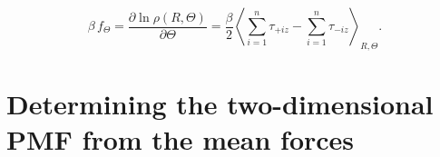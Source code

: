 \documentclass{article}
\begin{document}
%
%
$$
\beta \, f_{\Theta}
=
\frac{ \partial \ln \rho(R, \Theta) }
     { \partial \Theta }
=
\frac \beta 2
\left\langle
  \sum_{i = 1}^n \tau_{+iz}
  -
  \sum_{i = 1}^n \tau_{-iz}
\right\rangle_{R, \Theta}
.
$$



\section{Determining the two-dimensional PMF from the mean forces}
\end{document}
